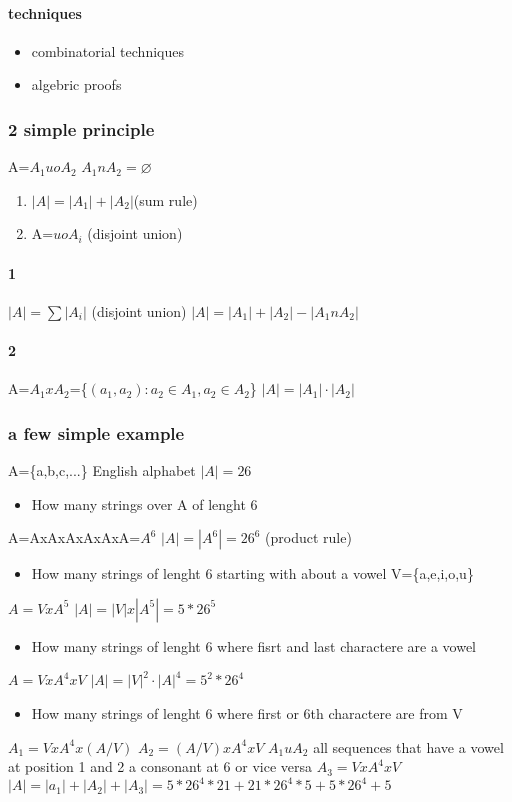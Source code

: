 \documentclass[a4paper,10pt]{article}
\begin{document}
\paragraph{techniques}
\begin{itemize}
 \item combinatorial techniques
 \item algebric proofs
\end{itemize}
\subsubsection{2 simple principle}
A=$A_1uoA_2$ $A_1nA_2=\varnothing$
\begin{enumerate}
 \item $|A|=|A_1|+|A_2|$(sum rule)
 \item A=$uoA_i$ (disjoint union)
\end{enumerate}
\paragraph{1}
$|A|=\sum|A_i|$ (disjoint union)
\newline
$|A|=|A_1|+|A_2|-|A_1nA_2|$
\paragraph{2}
A=$A_1xA_2$=\{$(a_1,a_2):a_2\in A_1,a_2\in A_2$\}
\newline
$|A|=|A_1|\cdot |A_2|$
\subsubsection{a few simple example}
A=\{a,b,c,...\} English alphabet
\newline
$|A|=26$
\begin{itemize}
 \item How many strings over A of lenght 6
\end{itemize}
A=AxAxAxAxAxA=$A^6$
\newline
$|A|=|A^6|=26^6$ (product rule)
\begin{itemize}
 \item How many strings of lenght 6 starting with about a vowel V=\{a,e,i,o,u\}
\end{itemize}

$A=VxA^5$
\newline
$|A|=|V|x|A^5|=5*26^5$
\begin{itemize}
 \item How many strings of lenght 6 where fisrt and last charactere are a vowel
\end{itemize}
$A=VxA^4xV$
\newline
$|A|=|V|^2\cdot |A|^4=5^2*26^4$
\begin{itemize}
 \item How many strings of lenght 6 where first or 6th charactere are from V
\end{itemize}
$A_1=VxA^4x(A/V)$
\newline
$A_2=(A/V)xA^4xV$
\newline
$A_1uA_2$ all sequences that have a vowel at position 1 and 2 a consonant at 6 or vice versa
\newline
$A_3=VxA^4xV$
\newline
$|A|=|a_1|+|A_2|+|A_3|=5*26^4*21+21*26^4*5+5*26^4+5$
\end{document}
